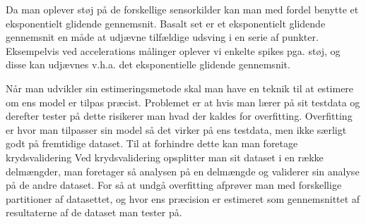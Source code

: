 \begin{description}[style=nextline]
\item[Eksponentielt glidende gennemsnit]
Da man oplever støj på de forskellige sensorkilder kan man med fordel benytte et eksponentielt glidende gennemsnit.
Basalt set er et eksponentielt glidende gennemsnit en måde at udjævne tilfældige udsving i en serie af punkter.
Eksempelvis ved accelerations målinger oplever vi enkelte spikes pga. støj, og disse kan udjævnes v.h.a. det eksponentielle glidende gennemsnit.

\item[Krydsvalidering]
Når man udvikler sin estimeringsmetode skal man have en teknik til at estimere om ens model er tilpas præcist.
Problemet er at hvis man lærer på sit testdata og derefter tester på dette risikerer man hvad der kaldes for overfitting.
Overfitting er hvor man tilpasser sin model så det virker på ens testdata, men ikke særligt godt på fremtidige dataset.
Til at forhindre dette kan man foretage krydsvalidering
Ved krydsvalidering opsplitter man sit dataset i en række delmængder, man foretager så analysen på en delmængde og validerer sin analyse på de andre dataset.
For så at undgå overfitting afprøver man med forskellige partitioner af datasettet, og hvor ens præcision er estimeret som gennemsnittet af resultaterne af de dataset man tester på.

\end{description}